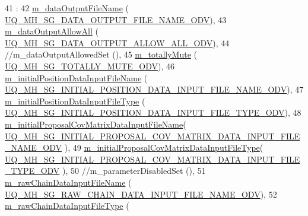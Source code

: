 \begin{DoxyCode}
41   :
42   \hyperlink{class_q_u_e_s_o_1_1_mh_options_values_a768664ee23ad3783751eca33eaeb14b9}{m\_dataOutputFileName}                       (
      \hyperlink{_metropolis_hastings_s_g_options_8h_a429b42cebbd00d174ed2efac802abaf1}{UQ\_MH\_SG\_DATA\_OUTPUT\_FILE\_NAME\_ODV}),
43   \hyperlink{class_q_u_e_s_o_1_1_mh_options_values_a618cab38b10aab9a1c868a2d8672f374}{m\_dataOutputAllowAll}                       (
      \hyperlink{_metropolis_hastings_s_g_options_8h_acbcb85de420cccf7be4cef22854687aa}{UQ\_MH\_SG\_DATA\_OUTPUT\_ALLOW\_ALL\_ODV}),
44 \textcolor{comment}{//m\_dataOutputAllowedSet                     (),}
45   \hyperlink{class_q_u_e_s_o_1_1_mh_options_values_af812309e81191e88dfdc87c5815141a3}{m\_totallyMute}                              (
      \hyperlink{_metropolis_hastings_s_g_options_8h_acb9f240640622a2d5960ac52187000fc}{UQ\_MH\_SG\_TOTALLY\_MUTE\_ODV}),
46   \hyperlink{class_q_u_e_s_o_1_1_mh_options_values_a208c0eb1f88ee743b2710afb503c4b4d}{m\_initialPositionDataInputFileName}         (
      \hyperlink{_metropolis_hastings_s_g_options_8h_a33cdb8e98a96faf5965251da49ea1738}{UQ\_MH\_SG\_INITIAL\_POSITION\_DATA\_INPUT\_FILE\_NAME\_ODV}),
47   \hyperlink{class_q_u_e_s_o_1_1_mh_options_values_ad5bdf1c0416c71aeef586e4c86b4d4be}{m\_initialPositionDataInputFileType}         (
      \hyperlink{_metropolis_hastings_s_g_options_8h_a27ebaa9c84f210aba1c4c3e5efd88cb4}{UQ\_MH\_SG\_INITIAL\_POSITION\_DATA\_INPUT\_FILE\_TYPE\_ODV}),
48   \hyperlink{class_q_u_e_s_o_1_1_mh_options_values_af4cc4b8f1cea9441c9243d3ada49796b}{m\_initialProposalCovMatrixDataInputFileName}(
      \hyperlink{_metropolis_hastings_s_g_options_8h_ae1bcc09f86196a9dd9ff246c4f045ccc}{UQ\_MH\_SG\_INITIAL\_PROPOSAL\_COV\_MATRIX\_DATA\_INPUT\_FILE\_NAME\_ODV}
      ),
49   \hyperlink{class_q_u_e_s_o_1_1_mh_options_values_afd25d3ec572922fe1cf7ff39d431633e}{m\_initialProposalCovMatrixDataInputFileType}(
      \hyperlink{_metropolis_hastings_s_g_options_8h_a7b132e374b4dc6168db874b08f6268be}{UQ\_MH\_SG\_INITIAL\_PROPOSAL\_COV\_MATRIX\_DATA\_INPUT\_FILE\_TYPE\_ODV}
      ),
50 \textcolor{comment}{//m\_parameterDisabledSet                     (),}
51   \hyperlink{class_q_u_e_s_o_1_1_mh_options_values_a3d031c2cdc8f17c589e999d11782c8ba}{m\_rawChainDataInputFileName}                (
      \hyperlink{_metropolis_hastings_s_g_options_8h_a142f5c2c1733ac8304c69ee04ae6566d}{UQ\_MH\_SG\_RAW\_CHAIN\_DATA\_INPUT\_FILE\_NAME\_ODV}),
52   \hyperlink{class_q_u_e_s_o_1_1_mh_options_values_a61974cb51a10d03dcd317dcd10f2684f}{m\_rawChainDataInputFileType}                (

\end{DoxyCode}
